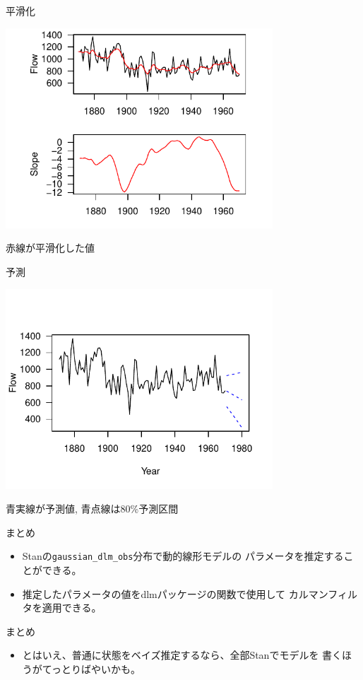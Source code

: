 \documentclass[dvipdfmx,12pt]{beamer}
\begin{document}
\begin{frame}{平滑化}
  \begin{center}
    \includegraphics[width=10cm]{dlm2_smooth}
  \end{center}

  赤線が平滑化した値
\end{frame}

\begin{frame}{予測}
  \begin{center}
    \includegraphics[width=10cm]{dlm2_predict}
  \end{center}

  青実線が予測値, 青点線は80\%予測区間
\end{frame}

\begin{frame}{まとめ}
  \begin{itemize}
  \item \textsf{Stan}の\texttt{gaussian\_dlm\_obs}分布で動的線形モデルの
    パラメータを推定することができる。
  \item 推定したパラメータの値を\textsf{dlm}パッケージの関数で使用して
    カルマンフィルタを適用できる。
  \end{itemize}
\end{frame}

\begin{frame}{まとめ}
  \begin{itemize}
  \item とはいえ、普通に状態をベイズ推定するなら、全部\textsf{Stanで}モデルを
    書くほうがてっとりばやいかも。

  \end{itemize}
\end{frame}
\end{document}
